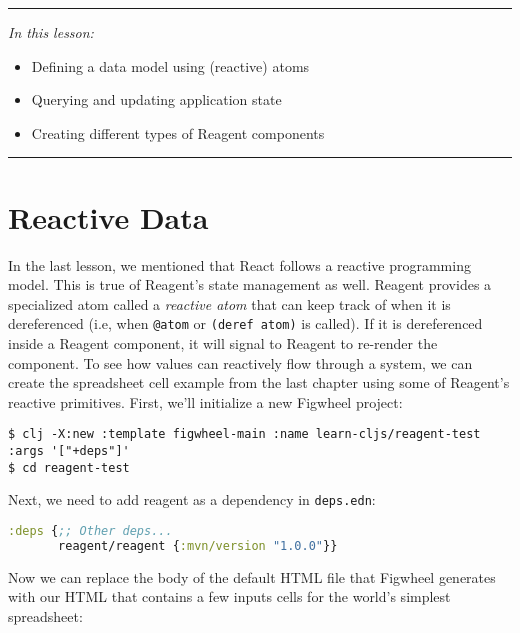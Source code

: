\documentclass[10pt,twoside,openright]{memoir}
\begin{document}
\begin{center}\rule{0.5\linewidth}{0.5pt}\end{center}

\emph{In this lesson:}

\begin{itemize}
\tightlist
\item
  Defining a data model using (reactive) atoms
\item
  Querying and updating application state
\item
  Creating different types of Reagent components
\end{itemize}

\begin{center}\rule{0.5\linewidth}{0.5pt}\end{center}


\section{Reactive Data}

In the last lesson, we mentioned that React follows a reactive
programming model. This is true of Reagent's state management as well.
Reagent provides a specialized atom called a \emph{reactive atom} that
can keep track of when it is dereferenced (i.e, when \texttt{@atom} or
\texttt{(deref\ atom)} is called). If it is dereferenced inside a
Reagent component, it will signal to Reagent to re-render the component.
To see how values can reactively flow through a system, we can create
the spreadsheet cell example from the last chapter using some of
Reagent's reactive primitives. First, we'll initialize a new Figwheel
project:

\begin{verbatim}
$ clj -X:new :template figwheel-main :name learn-cljs/reagent-test :args '["+deps"]'
$ cd reagent-test
\end{verbatim}

Next, we need to add reagent as a dependency in \texttt{deps.edn}:

\begin{lstlisting}[language=Clojure, caption={deps.edn}]
:deps {;; Other deps...
       reagent/reagent {:mvn/version "1.0.0"}}
\end{lstlisting}

Now we can replace the body of the default HTML file that Figwheel
generates with our HTML that contains a few inputs cells for the world's
simplest spreadsheet:
\end{document}
